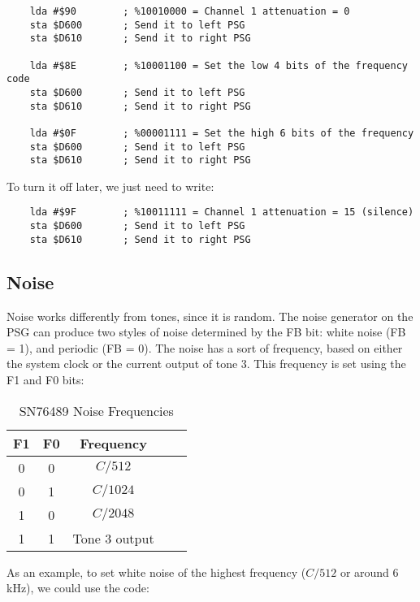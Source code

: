 \begin{verbatim}
    lda #$90        ; %10010000 = Channel 1 attenuation = 0
    sta $D600       ; Send it to left PSG
    sta $D610       ; Send it to right PSG

    lda #$8E        ; %10001100 = Set the low 4 bits of the frequency code
    sta $D600       ; Send it to left PSG
    sta $D610       ; Send it to right PSG

    lda #$0F        ; %00001111 = Set the high 6 bits of the frequency
    sta $D600       ; Send it to left PSG
    sta $D610       ; Send it to right PSG
\end{verbatim}
To turn it off later, we just need to write:

\begin{verbatim}
    lda #$9F        ; %10011111 = Channel 1 attenuation = 15 (silence)
    sta $D600       ; Send it to left PSG
    sta $D610       ; Send it to right PSG
\end{verbatim}

\subsection*{Noise}

Noise works differently from tones, since it is random. The noise generator on the PSG can produce two styles of noise determined by the FB bit: white noise (FB = 1), and periodic (FB = 0). The noise has a sort of frequency, based on either the system clock or the current output of tone 3. This frequency is set using the F1 and F0 bits:

\begin{table}[ht]
	\begin{center}
		\begin{tabular}{|c|c|c|c|l|} \hline
			F1 & F0 & Frequency \\ \hline \hline
			0 & 0 & $C / 512$ \\ \hline
			0 & 1 & $C / 1024$ \\ \hline
			1 & 0 & $C / 2048$ \\ \hline
			1 & 1 & Tone 3 output \\ \hline
		\end{tabular}
		\caption{SN76489 Noise Frequencies}
	\end{center}
	\label{tab:psg_noise_freq}
\end{table}

As an example, to set white noise of the highest frequency ($C / 512$ or around 6 kHz), we could use the code:

